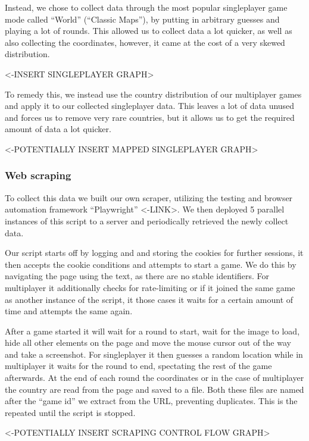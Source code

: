 \documentclass{article}
\begin{document}
Instead, we chose to collect data through the most popular singleplayer
game mode called ``World'' (``Classic Maps''), by putting in arbitrary
guesses and playing a lot of rounds. This allowed us to collect data a
lot quicker, as well as also collecting the coordinates, however, it
came at the cost of a very skewed distribution.

\textless-INSERT SINGLEPLAYER GRAPH\textgreater{}

To remedy this, we instead use the country distribution of our
multiplayer games and apply it to our collected singleplayer data. This
leaves a lot of data unused and forces us to remove very rare countries,
but it allows us to get the required amount of data a lot quicker.

\textless-POTENTIALLY INSERT MAPPED SINGLEPLAYER GRAPH\textgreater{}

\subsubsection{Web scraping}\label{web-scraping}

To collect this data we built our own scraper, utilizing the testing and
browser automation framework ``Playwright'' \textless-LINK\textgreater.
We then deployed 5 parallel instances of this script to a server and
periodically retrieved the newly collect data.

Our script starts off by logging and and storing the cookies for further
sessions, it then accepts the cookie conditions and attempts to start a
game. We do this by navigating the page using the text, as there are no
stable identifiers. For multiplayer it additionally checks for
rate-limiting or if it joined the same game as another instance of the
script, it those cases it waits for a certain amount of time and
attempts the same again.

After a game started it will wait for a round to start, wait for the
image to load, hide all other elements on the page and move the mouse
cursor out of the way and take a screenshot. For singleplayer it then
guesses a random location while in multiplayer it waits for the round to
end, spectating the rest of the game afterwards. At the end of each
round the coordinates or in the case of multiplayer the country are read
from the page and saved to a file. Both these files are named after the
``game id'' we extract from the URL, preventing duplicates. This is the
repeated until the script is stopped.

\textless-POTENTIALLY INSERT SCRAPING CONTROL FLOW GRAPH\textgreater{}
\end{document}
